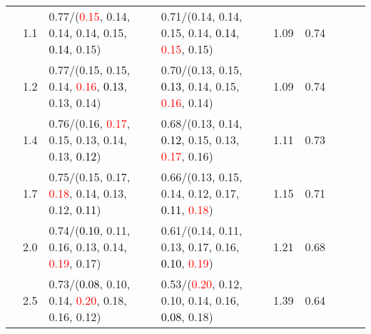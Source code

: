 \documentclass[10pt,a4paper]{report}
\begin{document}
\begin{table}[!htbp]
\begin{center}
{\begin{tabular}{ccllccccc}
				  & 1.1                               & 0.77/(\textcolor{red}{0.15}, 0.14, 0.14, 0.14, 0.15, \textcolor{black}{0.14}, 0.15)                                                                                                           & 0.71/(0.14, 0.14, 0.15, 0.14, \textcolor{black}{0.14}, \textcolor{red}{0.15}, 0.15)                                                                                                           & 1.09             & 0.74                     \\
				  & 1.2                               & 0.77/(0.15, 0.15, 0.14, \textcolor{red}{0.16}, \textcolor{black}{0.13}, 0.13, 0.14)                                                                                                           & 0.70/(0.13, 0.15, \textcolor{black}{0.13}, 0.14, 0.15, \textcolor{red}{0.16}, 0.14)                                                                                                           & 1.09             & 0.74                     \\
				  & 1.4                               & 0.76/(0.16, \textcolor{red}{0.17}, 0.15, 0.13, 0.14, 0.13, \textcolor{black}{0.12})                                                                                                           & 0.68/(0.13, 0.14, \textcolor{black}{0.12}, 0.15, 0.13, \textcolor{red}{0.17}, 0.16)                                                                                                           & 1.11             & 0.73                     \\
				  & 1.7                               & 0.75/(0.15, 0.17, \textcolor{red}{0.18}, 0.14, 0.13, 0.12, \textcolor{black}{0.11})                                                                                                           & 0.66/(0.13, 0.15, 0.14, 0.12, 0.17, \textcolor{black}{0.11}, \textcolor{red}{0.18})                                                                                                           & 1.15             & 0.71                     \\
				  & 2.0                               & 0.74/(\textcolor{black}{0.10}, 0.11, 0.16, 0.13, 0.14, \textcolor{red}{0.19}, 0.17)                                                                                                           & 0.61/(0.14, 0.11, 0.13, 0.17, 0.16, \textcolor{black}{0.10}, \textcolor{red}{0.19})                                                                                                           & 1.21             & 0.68                     \\
				  & 2.5                               & 0.73/(\textcolor{black}{0.08}, 0.10, 0.14, \textcolor{red}{0.20}, 0.18, 0.16, 0.12)                                                                                                           & 0.53/(\textcolor{red}{0.20}, 0.12, 0.10, 0.14, 0.16, \textcolor{black}{0.08}, 0.18)                                                                                                           & 1.39             & 0.64                     \\

\end{tabular}}
\end{center}
\end{table}
\end{document}

